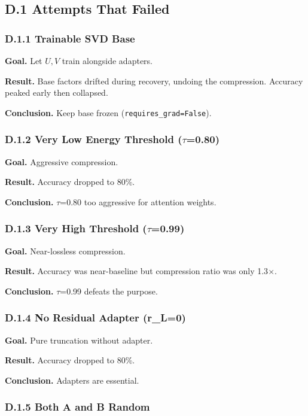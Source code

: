 \subsection{D.1 Attempts That Failed}

\subsubsection{D.1.1 Trainable SVD Base}

\textbf{Goal.} Let $U, V$ train alongside adapters.

\textbf{Result.} Base factors drifted during recovery, undoing the compression. 
Accuracy peaked early then collapsed.

\textbf{Conclusion.} Keep base frozen (\texttt{requires\_grad=False}).

\subsubsection{D.1.2 Very Low Energy Threshold ($\tau$=0.80)}

\textbf{Goal.} Aggressive compression.

\textbf{Result.} Accuracy dropped to 80\%.

\textbf{Conclusion.} $\tau$=0.80 too aggressive for attention weights.

\subsubsection{D.1.3 Very High Threshold ($\tau$=0.99)}

\textbf{Goal.} Near-lossless compression.

\textbf{Result.} Accuracy was near-baseline but compression ratio was only 
1.3$\times$.

\textbf{Conclusion.} $\tau$=0.99 defeats the purpose.

\subsubsection{D.1.4 No Residual Adapter (r\_L=0)}

\textbf{Goal.} Pure truncation without adapter.

\textbf{Result.} Accuracy dropped to 80\%.

\textbf{Conclusion.} Adapters are essential.

\subsubsection{D.1.5 Both A and B Random}

